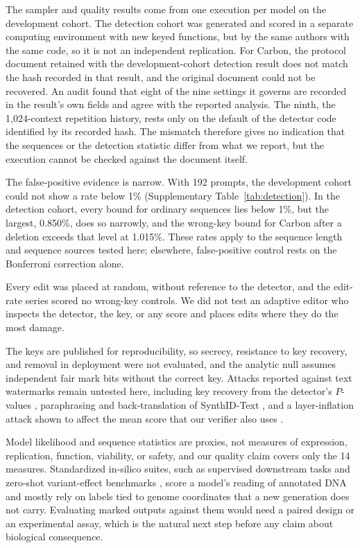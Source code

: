 \documentclass[10pt,twocolumn]{article}
\begin{document}
The sampler and quality results come from one execution per model on the development cohort. The
detection cohort was generated and scored in a separate computing environment with new keyed
functions, but by the same authors with the same code, so it is not an independent replication.
For Carbon, the protocol document retained with the development-cohort detection result does not
match the hash recorded in that result, and the original document could not be recovered. An audit
found that eight of the nine settings it governs are recorded in the result's own fields and agree
with the reported analysis. The ninth, the 1{,}024-context repetition history, rests only on the
default of the detector code identified by its recorded hash. The mismatch therefore gives no
indication that the sequences or the detection statistic differ from what we report, but the
execution cannot be checked against the document itself.

The false-positive evidence is narrow. With 192 prompts, the development cohort could not show a
rate below 1\% (Supplementary Table~\ref{tab:detection}). In the detection cohort, every bound for
ordinary sequences lies below 1\%, but the largest, 0.850\%, does so narrowly, and the wrong-key bound
for Carbon after a deletion exceeds that level at 1.015\%. These rates apply to the sequence length and
sequence sources tested here; elsewhere, false-positive control rests on the Bonferroni correction
alone.

Every edit was placed at random, without reference to the detector, and the edit-rate series scored
no wrong-key controls. We did not test an adaptive editor who inspects the detector, the key, or
any score and places edits where they do the most damage.

The keys are published for reproducibility, so secrecy, resistance to key recovery, and removal in
deployment were not evaluated, and the analytic null assumes independent fair mark bits without
the correct key. Attacks reported against text watermarks remain untested here, including key
recovery from the detector's $P$-values \cite{reynolds2025breaking}, paraphrasing and
back-translation of SynthID-Text \cite{han2025synthid}, and a layer-inflation attack shown to
affect the mean score that our verifier also uses \cite{omidi2026synthid}.

Model likelihood and sequence statistics are proxies, not measures of expression, replication,
function, viability, or safety, and our quality claim covers only the 14 measures. Standardized
in-silico suites, such as supervised downstream tasks and zero-shot variant-effect benchmarks
\cite{marin2024bend,liu2024genbench,patel2024darteval}, score a model's reading of annotated DNA
and mostly rely on labels tied to genome coordinates that a new generation does not carry.
Evaluating marked outputs against them would need a paired design or an experimental assay, which
is the natural next step before any claim about biological consequence.
\end{document}
